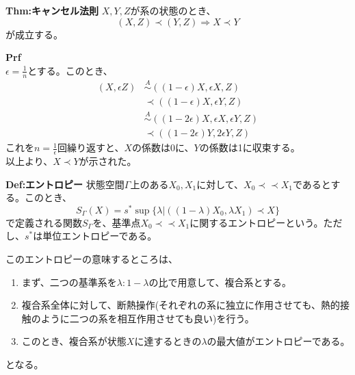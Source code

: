 \documentclass[a4paper,11pt]{jsarticle}
\numberwithin{equation}{section}
\begin{document}
\begin{itembox}[l]{\textbf{Thm:キャンセル法則}}
  $X,Y,Z$が系の状態のとき、
  \begin{equation}
      (X,Z) \prec (Y,Z) \Rightarrow X \prec Y
  \end{equation}
  が成立する。

\end{itembox}
\textbf{Prf}\\
$\epsilon =\frac{1}{n}$とする。このとき、
\begin{align}
    (X,\epsilon Z) &\overset{A}{\sim} ((1-\epsilon)X,\epsilon X,Z)\\
    &\prec ((1-\epsilon)X,\epsilon Y,Z)\\
    &\overset{A}{\sim} ((1-2\epsilon)X,\epsilon X,\epsilon Y,Z)\\
    &\prec ((1-2\epsilon)Y,2\epsilon Y,Z)
    \end{align}
これを$n=\frac{1}{\epsilon}$回繰り返すと、$X$の係数は0に、$Y$の係数は1に収束する。\\
以上より、$X \prec Y$が示された。\hfill\qedsymbol\\

\begin{itembox}[l]{\textbf{Def:エントロピー}}
  状態空間$\Gamma$上のある$X_0,X_1$に対して、$X_0 \prec \prec X_1$であるとする。このとき、
  \begin{equation}
      S_{\Gamma}(X) = s^* \sup\{\lambda|((1-\lambda)X_0,\lambda X_1) \prec X\}
  \end{equation}
  で定義される関数$S_{\Gamma}$を、基準点$X_0 \prec \prec X_1$に関するエントロピーという。ただし、$s^*$は単位エントロピーである。
\end{itembox}
このエントロピーの意味するところは、
\begin{enumerate}
  \item まず、二つの基準系を$\lambda : 1-\lambda$の比で用意して、複合系とする。
  \item 複合系全体に対して、断熱操作(それぞれの系に独立に作用させても、熱的接触のように二つの系を相互作用させても良い)を行う。
  \item このとき、複合系が状態$X$に達するときの$\lambda$の最大値がエントロピーである。
\end{enumerate}
となる。\\
\end{document}
